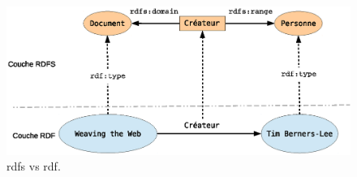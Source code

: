 \begin{figure}[h]
    \centering
    \includegraphics[width=1.05\textwidth]{figs/A/rdfs-vs-rdf-layers.eps}
    \caption{\acrshort{rdfs} vs
      \acrshort{rdf}.}\label{fig:rdfs-vs-rdf-layers}
\end{figure}
